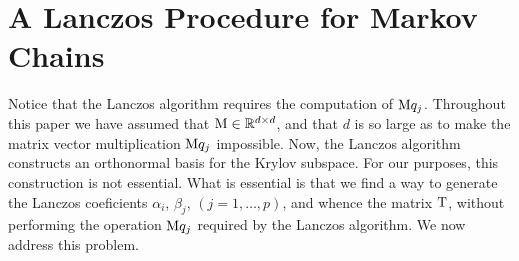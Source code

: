 \section{A Lanczos Procedure for Markov Chains}
\label{sec:lancz-proc-mark}
Notice that the Lanczos algorithm requires the computation of $\mathrm{M} q_j$. Throughout this
paper we have assumed that $\mathrm{M} \in \mathbb{R}^{d\times d}$, and that $d$ is so large as
to make the matrix vector multiplication $\mathrm{M} q_j$ impossible. Now, the Lanczos
algorithm constructs an orthonormal basis for the Krylov subspace. For our
purposes, this construction is not essential. What is essential is that we find
a way to generate the Lanczos coeficients $\alpha_i$, $\beta_j$, $(j = 1,\dots, p)$, and
whence the matrix $\mathrm{T}$, without performing the operation $\mathrm{M} q_j$ required by the
Lanczos algorithm. We now address this problem.

